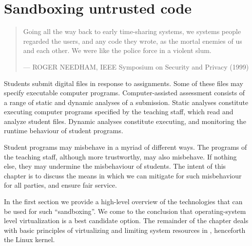 
\chapter{Sandboxing untrusted code}

\begin{quotation}

\footnotesize\sffamily\itshape

\begin{flushright}

Going all the way back to early time-sharing systems, we systems people
regarded the users, and any code they wrote, as the mortal enemies of us and
each other. We were like the police force in a violent slum.

\smallbreak

\upshape

--- ROGER NEEDHAM, IEEE Symposium on Security and Privacy (1999)

\end{flushright}

\end{quotation}

Students submit digital files in response to assignments. Some of these files
may specify executable computer programs. Computer-assisted assessment consists
of a range of static and dynamic analyses of a submission. Static analyses
constitute executing computer programs specified by the teaching staff, which
read and analyze student files. Dynamic analyses constitute executing, and
monitoring the runtime behaviour of student programs.

Student programs may misbehave in a myriad of different ways. The programs of
the teaching staff, although more trustworthy, may also misbehave. If nothing
else, they may undermine the misbehaviour of students. The intent of this
chapter is to discuss the means in which we can mitigate for such misbehaviour
for all parties, and ensure fair service.

In the first section we provide a high-level overview of the technologies that
can be used for such ``sandboxing''. We come to the conclusion that
operating-system level virtualization is a best candidate option. The remainder
of the chapter deals with basic principles of virtualizing and limiting system
resources in \cite{linux-kernel-v3.14.2}, henceforth the Linux kernel.












